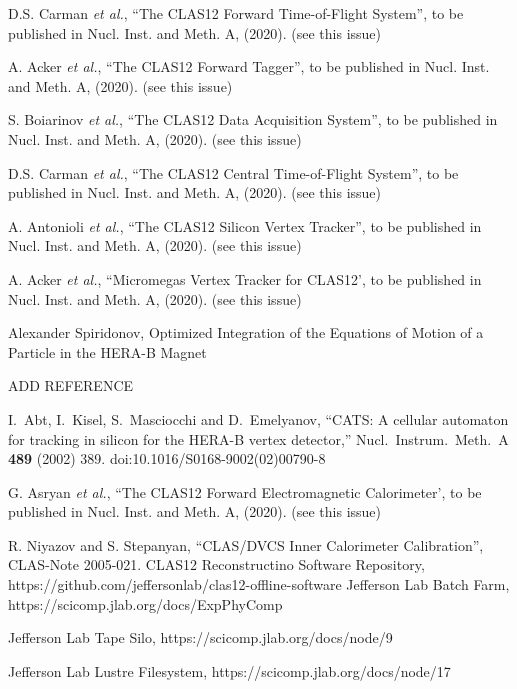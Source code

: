 \documentclass[3p,times,twocolumn]{elsarticle}
\begin{document}
\begin{thebibliography}{99}
D.S. Carman {\it et al.},   ``The CLAS12 Forward Time-of-Flight System'', to be published in Nucl.
Inst. and Meth. A, (2020). (see this issue)

A. Acker {\it et al.}, ``The CLAS12 Forward Tagger'', to be published in Nucl. Inst. and
Meth. A, (2020). (see this issue)

S. Boiarinov {\it et al.}, ``The CLAS12 Data Acquisition System'', to be published in Nucl. Inst. and
Meth. A, (2020). (see this issue)

D.S. Carman {\it et al.}, ``The CLAS12 Central Time-of-Flight System'', to be published in Nucl.
Inst. and Meth. A, (2020). (see this issue)

A. Antonioli {\it et al.}, ``The CLAS12 Silicon Vertex Tracker'', to be published in Nucl. Inst. and
Meth. A, (2020). (see this issue)

A. Acker {\it et al.}, ``Micromegas Vertex Tracker for CLAS12', to be published in Nucl. Inst. and
Meth. A, (2020). (see this issue)

Alexander Spiridonov, Optimized Integration of the Equations of Motion of a Particle in the HERA-B Magnet

ADD REFERENCE

I.~Abt, I.~Kisel, S.~Masciocchi and D.~Emelyanov,
``CATS: A cellular automaton for tracking in silicon for the HERA-B vertex detector,''
Nucl.\ Instrum.\ Meth.\ A {\bf 489} (2002) 389.
doi:10.1016/S0168-9002(02)00790-8

G. Asryan {\it et al.}, ``The CLAS12 Forward Electromagnetic Calorimeter', to be published in Nucl. Inst. and
Meth. A, (2020). (see this issue)

R. Niyazov and S. Stepanyan, ``CLAS/DVCS Inner Calorimeter Calibration'', CLAS-Note 2005-021.
{CLAS12 Reconstructino Software Repository},
https://github.com/jeffersonlab/clas12-offline-software
{Jefferson Lab Batch Farm},
https://scicomp.jlab.org/docs/ExpPhyComp

{Jefferson Lab Tape Silo},
https://scicomp.jlab.org/docs/node/9

{Jefferson Lab Lustre Filesystem},
https://scicomp.jlab.org/docs/node/17

\end{thebibliography}
\end{document}
